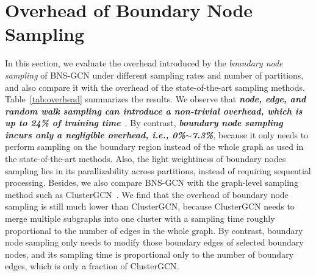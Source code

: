 \documentclass{article}
\begin{document}
\section{Overhead of Boundary Node Sampling}
\label{sec:sampling_overhead}
In this section, we evaluate the overhead introduced by the \textit{boundary node sampling} of BNS-GCN under different sampling rates and number of partitions, and also compare it with the overhead of the state-of-the-art sampling methods.
Table~\ref{tab:overhead} summarizes the results.
We observe that \textit{\textbf{node, edge, and random walk sampling can introduce a non-trivial overhead, which is up to 24\% of training time}}~\citep{zeng2019graphsaint}.
By contrast, \textbf{\textit{boundary node sampling incurs only a negligible overhead, i.e., 0\%$\sim$7.3\%}}, because it only needs to perform sampling on the boundary region instead of the whole graph as used in the state-of-the-art methods.
Also, the light weightiness of boundary nodes sampling lies in its parallizability across partitions, instead of requiring sequential processing.
Besides, we also compare BNS-GCN with the graph-level sampling method such as ClusterGCN~\citep{chiang2019cluster}.
We find that the overhead of boundary node sampling is still much lower than ClusterGCN, because ClusterGCN needs to merge multiple subgraphs into one cluster with a sampling time roughly proportional to the number of edges in the whole graph. 
By contrast, boundary node sampling only needs to modify those boundary edges of selected boundary nodes, and its sampling time is proportional only to the number of boundary edges, which is only a fraction of ClusterGCN.
\end{document}
